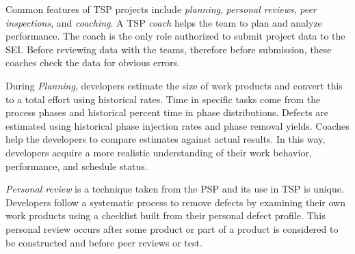 \documentclass[smallcondesed]{svjour3}
\begin{document}

Common features of TSP projects include {\em planning}, {\em personal reviews}, {\em peer inspections}, and {\em coaching}.
A TSP {\em coach} helps the team to plan and analyze performance. The coach is the only role authorized to submit project data to the SEI.
Before reviewing data with the teams, therefore before submission, these coaches check the data for obvious errors.

During {\em Planning}, developers estimate the size of work products and convert this to a total effort using historical rates. Time in specific tasks come from the  process phases and historical percent time in phase distributions. Defects are estimated using historical phase injection rates and phase removal yields. Coaches help the developers to compare estimates against actual results. In this way, developers acquire a more realistic understanding of their work behavior, performance, and schedule status.

{\em Personal review} is a technique taken from the PSP and its use in TSP is unique.  Developers follow a systematic process to remove defects by  examining their own work products using a checklist built from their personal defect profile. This personal review occurs after some product or part of a product is considered to be constructed and before peer reviews or test. 

  
 
 
\end{document}
